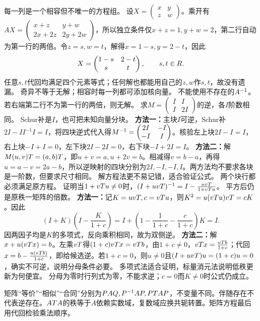 {每一列是一个相容但不唯一的方程组。}
{设$X=\begin{pmatrix}x&y\\z&w\end{pmatrix}$。乘开有$AX=\begin{pmatrix}x+z&y+w\\2x+2z&2y+2w\end{pmatrix}$，所以独立条件仅$x+z=1,y+w=2$，第二行自动为第一行的两倍。令$z=s,w=t$，解得$x=1-s,y=2-t$，因此
\[X=\begin{pmatrix}1-s&2-t\\s&t\end{pmatrix},\qquad s,t\in R.\]
任意$s,t$代回均满足四个元素等式；任何解也都能用自己的$z,w$作$s,t$，故没有遗漏。}
{奇异不等于无解；相容时每一列都可添加核向量。}
{不能使用不存在的$A^{-1}$。若右端第二行不为第一行的两倍，则无解。}
{求$M=\begin{pmatrix}I&I\\I&2I\end{pmatrix}$的逆，各$I$阶数相同。}
{Schur补是$I$，也可把未知向量分块。}
{\textbf{方法一：}主块$I$可逆，Schur补$2I-II^{-1}I=I$，将四块逆式代入得$M^{-1}=\begin{pmatrix}2I&-I\\-I&I\end{pmatrix}$。核验左上块$2I-I=I$，右上块$-I+I=0$，左下块$2I-2I=0$，右下块$-I+2I=I$。
\textbf{方法二：}解$M(u,v)T=(a,b)T$，即$u+v=a,u+2v=b$。相减得$v=b-a$，再得$u=a-v=2a-b$，所以逆映射的四块分别为$2I,-I,-I,I$。两方法均不要求各块是一阶数，但要求尺寸相同。}
{解方程法更不易记错，适合验证公式。}
{两个块行都必须满足原方程。}
{证明当$1+vTu\ne0$时，$(I+uvT)^{-1}=I-\frac{uvT}{1+vTu}$。}
{平方后仍是原秩一矩阵的倍数。}
{\textbf{方法一：}记$K=uvT,c=vT u$，则$K^2=u(vT u)vT=cK$。因此
\[(I+K)\left(I-\dfrac{K}{1+c}\right)=I+\left(1-\dfrac1{1+c}-\dfrac c{1+c}\right)K=I.\]
因两因子均是$K$的多项式，反向乘积相同，故为双侧逆。
\textbf{方法二：}解$x+u(vT x)=b$。左乘$vT$得$(1+c)vT x=vT b$，由$1+c\ne0$，$vT x=\frac{vT b}{1+c}$；代回$x=b-\frac{u(vT b)}{1+c}$，即给候选逆。若$1+c=0$，则$u\ne0$且$(I+uvT)u=(1+c)u=0$，确实不可逆，说明分母条件必要。}
{多项式法适合证明，标量消元法说明低秩更新为何便宜。}
{分母为零时行列式为零，不能求逆；$c=0$而$K\ne0$时公式仍成立。}
\begin{warning}
矩阵“等价”“相似”“合同”分别为$PAQ,P^{-1} AP,PT AP$，不变量不同。伴随存在不代表逆存在。$AT A$的秩等于$A$依赖实数域，复数域应换共轭转置。矩阵方程最后用代回检验乘法顺序。
\end{warning}
